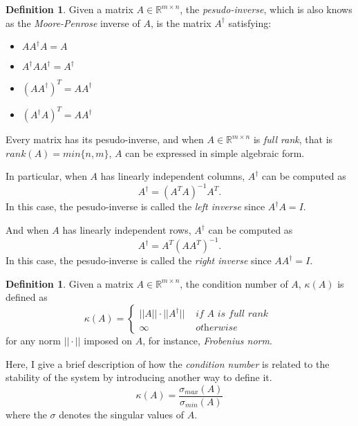 \documentclass[12pt]{amsart}
\numberwithin{equation}{section}
\theoremstyle{definition}
\newtheorem{definition}[thm]{Definition}
\numberwithin{thm}{section}
\begin{document}
\begin{definition}
     Given a matrix $A \in \mathbb{R}^{m \times n}$, the \emph{pesudo-inverse},
     which is also knows as the \emph{Moore-Penrose} inverse of $A$, is the matrix
     $A^\dagger$ satisfying:
     \begin{itemize}
          \item $A A^\dagger A = A$
          \item $A^\dagger A A^\dagger = A^\dagger$
          \item $(A A^\dagger)^T = A A^\dagger$
          \item $(A^\dagger A)^T = A A^\dagger$
        \end{itemize}
\end{definition}

Every matrix has its pesudo-inverse, and when $A \in \mathbb{R}^{m \times n}$ is \emph{full rank}, 
that is $rank(A) = min\{n, m\}$, $A$ can be expressed in simple algebraic form.

In particular, when $A$ has linearly independent columns, $A^\dagger$ can be computed as
\begin{equation*}
     A^\dagger = (A^T A)^{-1} A^T.
\end{equation*}
In this case, the pesudo-inverse is called the \emph{left inverse} since $A^\dagger A = I$.

\smallskip
And when $A$ has linearly independent rows, $A^\dagger$ can be computed as
\begin{equation*}
     A^\dagger = A^T (A A^T)^{-1}.
\end{equation*}
In this case, the pesudo-inverse is called the \emph{right inverse} since $A A^\dagger = I$. 

\begin{definition}
     \label{def:COND}
     Given a matrix $A \in \mathbb{R}^{m \times n}$, the condition number of $A$, $\kappa(A)$ is defined as
     \begin{equation*}
          \kappa(A) = \begin{cases}
                ||A|| \cdot ||A^\dagger|| & \textit{ if } A \textit{ is full rank } \\
                \infty & \textit{ otherwise }
          \end{cases}
     \end{equation*}
     for any norm $|| \cdot ||$ imposed on $A$, for instance, \emph{Frobenius norm}.
\end{definition}

Here, I give a brief description of how the \emph{condition number} is related to the stability of the system by introducing another way to define it.
\begin{equation*}
     \kappa(A) = \frac{\sigma_{max} (A)}{\sigma_{min} (A)}
\end{equation*}
where the $\sigma$ denotes the singular values of $A$.
\end{document}
